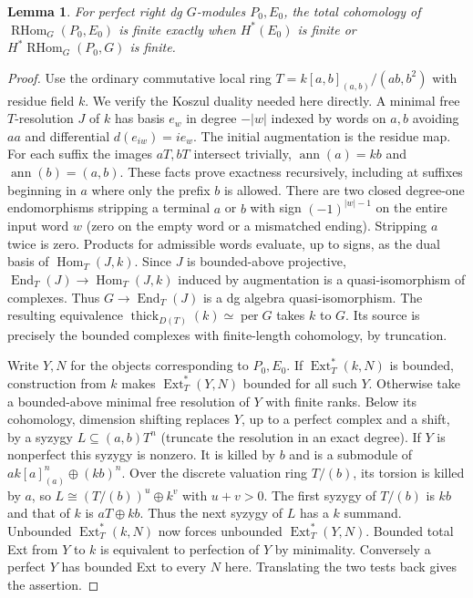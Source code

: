 \documentclass[11pt]{article}
\newtheorem{lemma}[theorem]{Lemma}
\newcommand{\per}{\operatorname{per}}
\newcommand{\HHom}{\operatorname{RHom}}
\newcommand{\Hom}{\operatorname{Hom}}
\newcommand{\Ext}{\operatorname{Ext}}
\newcommand{\thick}{\operatorname{thick}}
\begin{document}
\begin{lemma}\label{fibre}
For perfect right dg $G$-modules $P_0,E_0$, the total cohomology of
$\HHom_G(P_0,E_0)$ is finite exactly when
$H^*(E_0)$ is finite or $H^*\HHom_G(P_0,G)$ is finite.
\end{lemma}
\begin{proof}
Use the ordinary commutative local ring
$T=k[a,b]_{(a,b)}/(ab,b^2)$ with residue field $k$. We verify the
Koszul duality needed here directly. A minimal free $T$-resolution
$J$ of $k$ has basis $e_w$ in degree $-|w|$ indexed by words on $a,b$
avoiding $aa$ and differential $d(e_{iw})=i e_w$.
The initial augmentation is the residue map. For each suffix the images
$aT,bT$ intersect trivially, $\operatorname{ann}(a)=kb$ and
$\operatorname{ann}(b)=(a,b)$. These facts prove exactness recursively,
including at suffixes beginning in $a$ where only the prefix $b$ is allowed.
There are two closed degree-one endomorphisms stripping a terminal $a$
or $b$ with sign $(-1)^{|w|-1}$ on the entire input word $w$ (zero on
the empty word or a mismatched ending). Stripping $a$ twice is zero.
Products for admissible words evaluate, up to signs, as the dual basis
of $\Hom_T(J,k)$. Since $J$ is bounded-above projective,
$\operatorname{End}_T(J)\to\Hom_T(J,k)$ induced by augmentation is a
quasi-isomorphism of complexes. Thus $G\to\operatorname{End}_T(J)$ is
a dg algebra quasi-isomorphism. The resulting equivalence
$\thick_{D(T)}(k)\simeq\per G$ takes $k$ to $G$. Its source is precisely
the bounded complexes with finite-length cohomology, by truncation.

Write $Y,N$ for the objects corresponding to $P_0,E_0$. If
$\Ext_T^*(k,N)$ is bounded, construction from $k$ makes
$\Ext_T^*(Y,N)$ bounded for all such $Y$. Otherwise take a bounded-above
minimal free resolution of $Y$ with finite ranks. Below its cohomology,
dimension shifting replaces $Y$, up to a perfect complex and a shift,
by a syzygy $L\subseteq(a,b)T^n$ (truncate the resolution in an exact
degree). If $Y$ is nonperfect this syzygy is nonzero. It is killed by
$b$ and is a submodule of $a k[a]_{(a)}^n\oplus (kb)^n$. Over the
discrete valuation ring $T/(b)$, its torsion is killed by $a$, so
$L\cong (T/(b))^u\oplus k^v$ with $u+v>0$. The first syzygy of $T/(b)$
is $kb$ and that of $k$ is $aT\oplus kb$. Thus the next syzygy of $L$
has a $k$ summand. Unbounded $\Ext_T^*(k,N)$ now forces unbounded
$\Ext_T^*(Y,N)$. Bounded total Ext from $Y$ to $k$ is equivalent to
perfection of $Y$ by minimality. Conversely a perfect $Y$ has bounded
Ext to every $N$ here. Translating the two tests back gives the assertion.
\end{proof}
\end{document}

